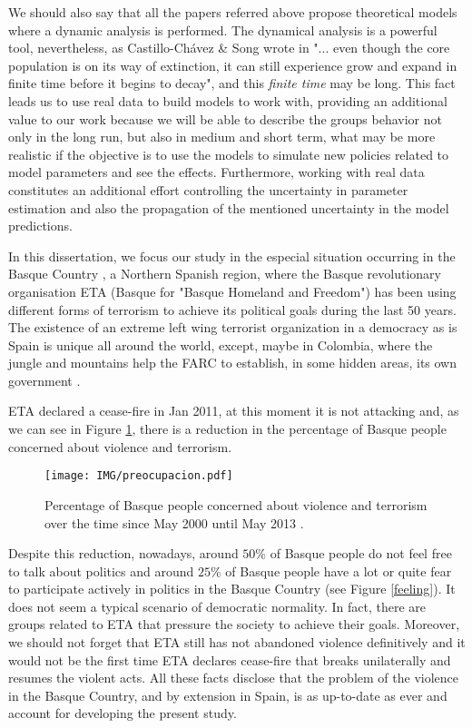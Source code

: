We should also say that all the papers referred above propose theoretical models where a dynamic analysis is performed. The dynamical analysis is a powerful tool, nevertheless, as Castillo-Ch\'avez \& Song wrote in \cite{Fanatismo} "... even though the core population is on its way of extinction, it can still experience grow and expand in finite time before it begins to decay", and this \textit{finite time} may be long. This fact leads us to use real data to build models to work with, providing an additional value to our work because we will be able to describe the groups behavior not only in the long run, but also in medium and short term, what may be more realistic if the objective is to use the models to simulate new policies related to model parameters and see the effects. Furthermore, working with real data constitutes an additional effort controlling the uncertainty in parameter estimation and also the propagation of the mentioned uncertainty in the model predictions.   

In this dissertation, we focus our study in the especial situation occurring in the Basque Country \cite{PaisVasco}, a Northern Spanish region, where the Basque revolutionary organisation ETA (Basque for "Basque Homeland and Freedom") \cite{wETA} has been using different forms of terrorism to achieve its political goals during the last 50 years. The existence of an extreme left wing terrorist organization \cite{PC} in a democracy as is Spain is unique all around the world, except, maybe in Colombia, where the jungle and mountains help the FARC to establish, in some hidden areas, its own government \cite{Lmiguel}.

ETA declared a cease-fire in Jan 2011, at this moment it is not attacking and, as we can see in Figure \ref{preocupa}, there is a reduction in the percentage of Basque people concerned about violence and terrorism.

\begin{figure}[ht]
  \centering
  \texttt{[image: IMG/preocupacion.pdf]}
  \caption{Percentage of Basque people concerned about violence and terrorism over the time since May 2000 until May 2013 \cite{eusko}.}
  \label{preocupa}
\end{figure}  

Despite this reduction, nowadays, around $50\%$ of Basque people do not feel free to talk about politics and around $25\%$ of Basque people have a lot or quite fear to participate actively in politics in the Basque Country (see Figure \ref{feeling}). It does not seem a typical scenario of democratic normality. In fact, there are groups related to ETA that pressure the society to achieve their goals. Moreover, we should not forget that ETA still has not abandoned violence definitively and it would not be the first time ETA declares cease-fire that breaks unilaterally and resumes the violent acts. All these facts disclose that the problem of the violence in the Basque Country, and by extension in Spain, is as up-to-date as ever and account for developing the present study.


